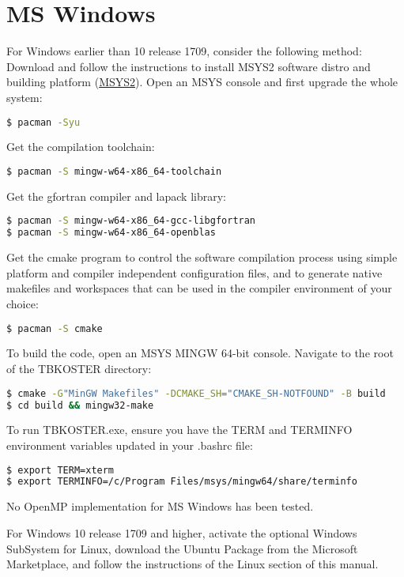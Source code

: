 \documentclass[12pt, onecolumn]{memoir}
\begin{document}
\section{MS Windows}
For Windows earlier than 10 release 1709, consider the following method:
Download and follow the instructions to install MSYS2 software distro and building platform (\href{http://www.msys2.org/}{MSYS2}). Open an MSYS console and first upgrade the whole system:
\begin{lstlisting}[language=sh,basicstyle=\small\ttfamily]
$ pacman -Syu
\end{lstlisting}
Get the compilation toolchain:
\begin{lstlisting}[language=sh,basicstyle=\small\ttfamily]
$ pacman -S mingw-w64-x86_64-toolchain
\end{lstlisting}
Get the gfortran compiler and lapack library:
\begin{lstlisting}[language=sh,basicstyle=\small\ttfamily,frame=single]
$ pacman -S mingw-w64-x86_64-gcc-libgfortran
$ pacman -S mingw-w64-x86_64-openblas
\end{lstlisting}
Get the cmake program to control the software compilation process using simple platform and compiler independent configuration files, and to generate native makefiles and workspaces that can be used in the compiler environment of your choice:
\begin{lstlisting}[language=bash,basicstyle=\small\ttfamily]
$ pacman -S cmake
\end{lstlisting}

To build the code, open an MSYS MINGW 64-bit console. Navigate to the root of the TBKOSTER directory:
\begin{lstlisting}[language=sh,basicstyle=\small\ttfamily,frame=single]
$ cmake -G"MinGW Makefiles" -DCMAKE_SH="CMAKE_SH-NOTFOUND" -B build
$ cd build && mingw32-make
\end{lstlisting}
To run TBKOSTER.exe, ensure you have the TERM and TERMINFO environment variables updated in your .bashrc file:
\begin{lstlisting}[language=sh,basicstyle=\small\ttfamily]
$ export TERM=xterm
$ export TERMINFO=/c/Program Files/msys/mingw64/share/terminfo
\end{lstlisting}
No OpenMP implementation for MS Windows has been tested.

For Windows 10 release 1709 and higher, activate the optional Windows SubSystem for Linux, download the Ubuntu Package from the Microsoft Marketplace, and follow the instructions of the Linux section of this manual.
\vfil
\end{document}
